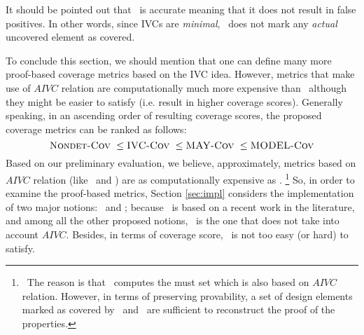 It should be pointed out that \ivccov\ is accurate meaning that it does not result in false positives. In other words, since IVCs are \emph{minimal}, \ivccov\ does not mark
any \emph{actual} uncovered element as covered.

To conclude this section, we should mention that one can define many more proof-based coverage metrics based on the IVC idea. However, metrics that make use of $AIVC$ relation are computationally much more expensive than \ivccov\ although they might be easier to satisfy (i.e. result in higher coverage scores).  Generally speaking,
in an ascending order of resulting coverage scores,
the proposed coverage metrics can be ranked as follows:
$$\text{\sc Nondet-Cov}\ \leq \text{\sc IVC-Cov}\ \leq \text{\sc MAY-Cov}\ \leq \text{\sc MODEL-Cov}$$
Based on our preliminary evaluation, we believe, approximately, metrics based on
$AIVC$ relation (like \maycov\ and \allcov) are as computationally expensive as \nondetcov . \footnote{\noindent ~The reason is that \nondetcov\ computes the must set which is also based on $AIVC$ relation. However, in terms of preserving provability, a set of design elements marked as covered by \allcov\ and \maycov\ are
sufficient to reconstruct the proof of the properties.} So, in order to examine the proof-based metrics, Section \ref{sec:impl} considers the implementation of two major notions: \nondetcov\ and
 \ivccov ; because \nondetcov\ is based on a recent work in the literature,
 and among all the other proposed notions, \ivccov\ is the
 one that does not take into account $AIVC$.
 Besides, in terms of coverage score, \ivccov\ is not too easy (or hard) to satisfy.  